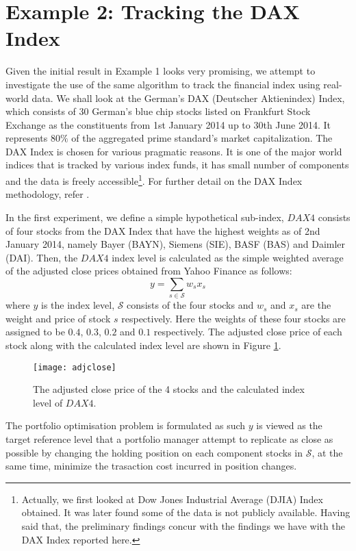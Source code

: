 \section{Example 2: Tracking the DAX Index}
\label{sec:exp2}
Given the initial result in Example 1 looks very promising, we attempt to investigate the use of the same algorithm to track the financial index using real-world data. We shall look at the German's DAX (Deutscher Aktienindex) Index, which consists of 30 German's blue chip stocks listed on Frankfurt Stock Exchange as the constituents from 1st January 2014 up to 30th June 2014. It represents $80\%$ of the aggregated prime standard's market capitalization. The DAX Index is chosen for various pragmatic reasons. It is one of the major world indices that is tracked by various index funds, it has small number of components and the data is freely accessible\footnote{Actually, we first looked at Dow Jones Industrial Average (DJIA) Index obtained. It was later found some of the data is not publicly available. Having said that, the preliminary findings concur with the findings we have with the DAX Index reported here.}. For further detail on the DAX Index methodology, refer \cite{DAX14}.
 
In the first experiment, we define a simple hypothetical sub-index, $DAX4$ consists of four stocks from the DAX Index that have the highest weights as of 2nd January 2014, namely Bayer (BAYN), Siemens (SIE), BASF (BAS) and Daimler (DAI). Then, the $DAX4$ index level is calculated as the simple weighted average of the adjusted close prices obtained from Yahoo Finance as follows:
\begin{equation}
  y = \sum_{s \in \mathcal{S}} w_s x_s
\end{equation}
where $y$ is the index level, $\mathcal{S}$ consists of the four stocks and  $w_s$ and $x_s$ are the weight and price of stock $s$ respectively. Here the weights of these four stocks are assigned to be $0.4$, $0.3$, $0.2$ and $0.1$ respectively. The adjusted close price of each stock along with the calculated index level are shown in Figure \ref{fig:adjclose}.
 
\begin{figure}[htbp]
\centering
\texttt{[image: adjclose]}
\caption{The adjusted close price of the 4 stocks and the calculated index level of $DAX4$.}
\label{fig:adjclose}
\end{figure}
 
The portfolio optimisation problem is formulated as such $y$ is viewed as the target reference level that a portfolio manager attempt to replicate as close as possible by changing the holding position on each component stocks in $\mathcal{S}$, at the same time, minimize the trasaction cost incurred in position changes.
 
